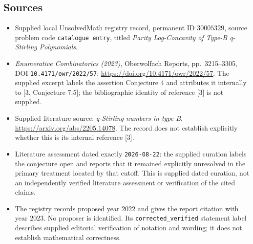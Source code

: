 \documentclass[11pt]{article}
\begin{document}
\subsection{Sources}
\begin{itemize}
\item Supplied local UnsolvedMath registry record, permanent ID $30005329$, source problem code \texttt{catalogue entry}, titled \emph{Parity Log-Concavity of Type-B q-Stirling Polynomials}.
\item \emph{Enumerative Combinatorics (2023)}, Oberwolfach Reports, pp.~3215--3305, DOI \texttt{10.4171/owr/2022/57}: \url{https://doi.org/10.4171/owr/2022/57}. The supplied excerpt labels the assertion Conjecture 4 and attributes it internally to [3, Conjecture 7.5]; the bibliographic identity of reference [3] is not supplied.
\item Supplied literature source: \emph{q-Stirling numbers in type B}, \url{https://arxiv.org/abs/2205.14078}. The record does not establish explicitly whether this is its internal reference [3].
\item Literature assessment dated exactly \texttt{2026-08-22}: the supplied curation labels the conjecture open and reports that it remained explicitly unresolved in the primary treatment located by that cutoff. This is supplied dated curation, not an independently verified literature assessment or verification of the cited claims.
\item The registry records proposed year $2022$ and gives the report citation with year $2023$. No proposer is identified. Its \texttt{corrected\_verified} statement label describes supplied editorial verification of notation and wording; it does not establish mathematical correctness.
\end{itemize}
\end{document}
